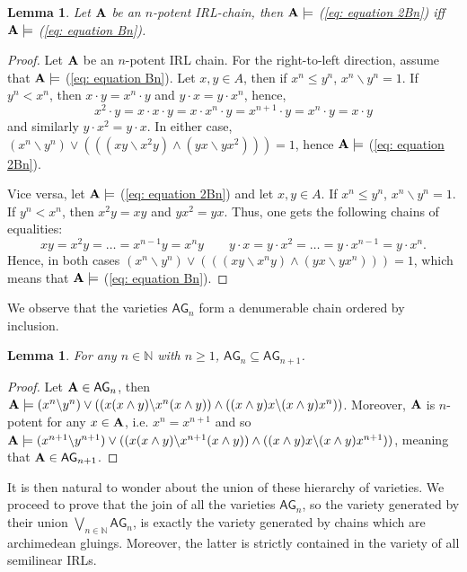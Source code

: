 \documentclass{amsart}
\newtheorem{lemma}[theorem]{Lemma}
\theoremstyle{definition}
\numberwithin{equation}{section}
\newcommand{\join}{\vee}
\newcommand{\meet}{\wedge}
\newcommand{\alg}[1]{{\textbf{\upshape #1}}}  %
\newcommand{\vv}[1]{\mathsf {#1}}
\newcommand{\BG}{\vv{AG}}
\begin{document}
 \begin{lemma}\label{rem: semplification axioms}
Let $\alg A$ be an $n$-potent IRL-chain, then $\alg A \models$ {\rm (\ref{eq: equation 2Bn})} iff $\alg A \models$ {\rm (\ref{eq: equation Bn})}.
 \end{lemma}
 \begin{proof}
 Let $\alg A$ be an $n$-potent IRL chain.
 	For the right-to-left direction, assume that $\alg A \models$ (\ref{eq: equation Bn}). Let $x, y \in A$, then if $x^n \leq y^n$, $x^n \backslash y^n=1$. If $y^n < x^n$, then $x \cdot y= x^n \cdot y$ and $y \cdot x = y \cdot x^n$, hence, $$x^2 \cdot y = x \cdot x \cdot y = x \cdot x^n \cdot y = x^{n+1}\cdot y = x^n \cdot y= x \cdot y$$ and similarly $y \cdot x^2 = y \cdot x$. In either case, $(x^n \backslash y^n) \join (((xy\backslash x^2y)\meet (yx \backslash yx^2)))=1$, hence $\alg A \models$ (\ref{eq: equation 2Bn}). 
 	
  Vice versa, let $\alg A \models$ (\ref{eq: equation 2Bn}) and let $x, y \in A$. If $x^n \leq y^n$, $x^n \backslash y^n=1$. If $y^n < x^n$, then $x^2y=xy$ and $yx^2=yx$. Thus, one gets the following chains of equalities:
$$
x y = x^2 y= \dots = x^{n-1}  y = x^n y \qquad y \cdot x= y \cdot x^2= \dots = y \cdot x^{n-1} =y \cdot x^n.
$$
Hence, in both cases $(x^n \backslash y^n) \join (((xy\backslash x^ny)\meet (yx \backslash yx^n)))=1$, which means that $\alg A \models $ (\ref{eq: equation Bn}).
 \end{proof}

We observe that the varieties $\BG_n$ form a denumerable chain ordered by inclusion.
\begin{lemma}
	For any $n \in \mathbb{N}$ with $n \geq 1$, $\BG_{n} \subseteq \BG_{n+1}$.
\end{lemma}
\begin{proof}
	Let $\alg A \in \BG_{n}$, then $\alg A \models (x^n \backslash y^n) \join ((x(x \meet y) \backslash x^n(x \meet y))\meet ((x \meet y)x \backslash (x \meet y)x^n))$. Moreover, $\alg A$ is $n$-potent for any $x \in \alg A$, i.e. $x^n=x^{n+1}$ and so $\alg A \models (x^{n+1} \backslash y^{n+1}) \join ((x(x \meet y) \backslash x^{n+1}(x \meet y))\meet ((x \meet y)x \backslash (x \meet y)x^{n+1}))$, meaning that $\alg A \in \vv \BG_{n+1}$.
\end{proof}
It is then natural to wonder about the union of these hierarchy of varieties. We proceed to prove that the join of all the varieties $\BG_{n}$, so the variety generated by their union $\bigvee_{n \in \mathbb N} \BG_{n}$, is exactly the variety generated by chains which are archimedean gluings. Moreover, the latter is strictly contained in the variety of all semilinear IRLs.
\end{document}

